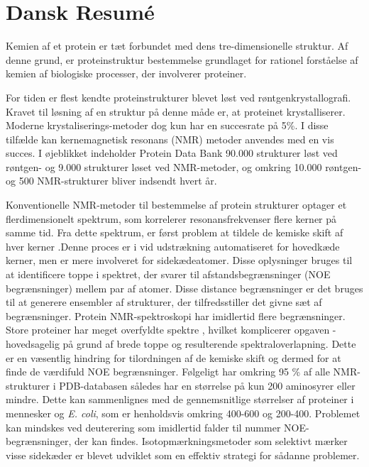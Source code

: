 \chapter*{Dansk Resumé}

Kemien af et protein er tæt forbundet med dens tre-dimensionelle struktur. Af denne grund, er proteinstruktur bestemmelse grundlaget for rationel forståelse af kemien af biologiske processer, der involverer proteiner.

For tiden er flest kendte proteinstrukturer blevet løst ved røntgenkrystallografi. Kravet til løsning af en struktur på denne måde er, at proteinet krystalliserer. Moderne krystaliserings-metoder dog kun har en succesrate på 5\%\cite{xray}. I disse tilfælde kan kernemagnetisk resonans (NMR) metoder anvendes med en vis succes.
I øjeblikket indeholder Protein Data Bank 90.000 strukturer løst ved røntgen- og 9.000 strukturer løset ved NMR-metoder, og omkring 10.000 røntgen- og 500 NMR-strukturer bliver indsendt hvert år\cite{PDB}.

Konventionelle NMR-metoder til bestemmelse af protein strukturer optager et flerdimensionelt spektrum, som korrelerer resonansfrekvenser flere kerner på samme tid.
Fra dette spektrum, er først problem at tildele de kemiske skift af hver kerner .Denne proces er i vid udstrækning automatiseret for hovedkæde kerner, men er mere involveret for sidekædeatomer.  Disse  oplysninger bruges til at identificere toppe i spektret, der svarer til afstandsbegrænsninger (NOE begrænsninger) mellem par af atomer. Disse distance begrænsninger er det bruges til at generere ensembler af strukturer, der tilfredsstiller det givne sæt af begrænsninger.
Protein NMR-spektroskopi har imidlertid flere begrænsninger. Store proteiner har meget overfyldte spektre , hvilket komplicerer opgaven - hovedsagelig på grund af brede toppe og resulterende spektraloverlapning.
Dette er en væsentlig hindring for tilordningen af de kemiske skift og dermed for at finde de
værdifuld NOE begrænsninger. Følgeligt har omkring 95 \% af alle NMR- strukturer i PDB-databasen således har en størrelse på kun 200 aminosyrer eller mindre. Dette kan sammenlignes med de gennemsnitlige størrelser af proteiner i mennesker og \textit{E. coli}, som er henholdsvis omkring 400-600 og 200-400. Problemet kan mindskes ved deuterering  som imidlertid falder til nummer NOE-begrænsninger, der kan findes. Isotopmærkningsmetoder som selektivt mærker visse sidekæder er blevet udviklet som en effektiv strategi for sådanne problemer.

